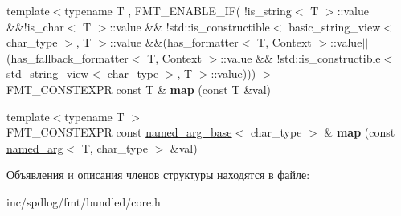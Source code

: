 \begin{DoxyCompactItemize}
{\footnotesize template$<$typename T , F\+M\+T\+\_\+\+E\+N\+A\+B\+L\+E\+\_\+\+I\+F( !is\+\_\+string$<$ T $>$\+::value \&\&!is\+\_\+char$<$ T $>$\+::value \&\& !std\+::is\+\_\+constructible$<$ basic\+\_\+string\+\_\+view$<$ char\+\_\+type $>$, T $>$\+::value \&\&(has\+\_\+formatter$<$ T, Context $>$\+::value$\vert$$\vert$(has\+\_\+fallback\+\_\+formatter$<$ T, Context $>$\+::value \&\& !std\+::is\+\_\+constructible$<$ std\+\_\+string\+\_\+view$<$ char\+\_\+type $>$, T $>$\+::value))) $>$ }\\F\+M\+T\+\_\+\+C\+O\+N\+S\+T\+E\+X\+PR const T \& {\bfseries map} (const T \&val)
\item 
\mbox{\label{structinternal_1_1arg__mapper_a8d184c5f75b81e169c1f8f497d3d92c0}} 
{\footnotesize template$<$typename T $>$ }\\F\+M\+T\+\_\+\+C\+O\+N\+S\+T\+E\+X\+PR const \hyperlink{structinternal_1_1named__arg__base}{named\+\_\+arg\+\_\+base}$<$ char\+\_\+type $>$ \& {\bfseries map} (const \hyperlink{structinternal_1_1named__arg}{named\+\_\+arg}$<$ T, char\+\_\+type $>$ \&val)
\end{DoxyCompactItemize}


Объявления и описания членов структуры находятся в файле\+:\begin{DoxyCompactItemize}
\item 
inc/spdlog/fmt/bundled/core.\+h\end{DoxyCompactItemize}
